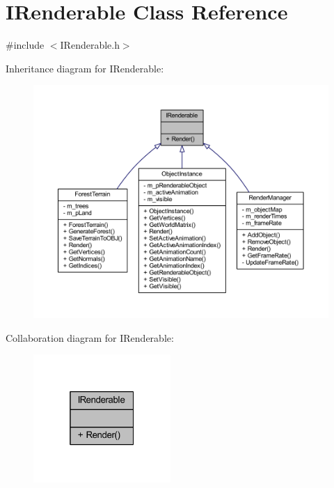 \hypertarget{class_i_renderable}{}\section{I\+Renderable Class Reference}
\label{class_i_renderable}


{\ttfamily \#include $<$I\+Renderable.\+h$>$}



Inheritance diagram for I\+Renderable\+:\nopagebreak
\begin{figure}[H]
\begin{center}
\leavevmode
\includegraphics[width=350pt]{class_i_renderable__inherit__graph}
\end{center}
\end{figure}


Collaboration diagram for I\+Renderable\+:\nopagebreak
\begin{figure}[H]
\begin{center}
\leavevmode
\includegraphics[width=148pt]{class_i_renderable__coll__graph}
\end{center}
\end{figure}
